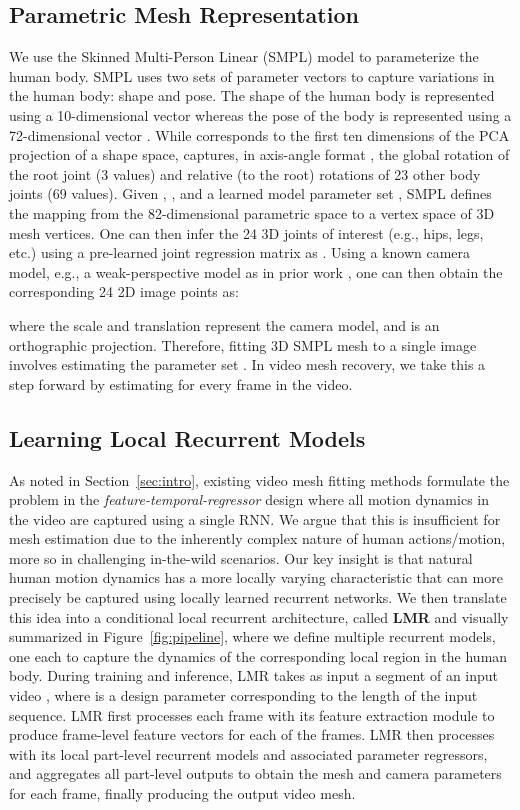 \documentclass[10pt,twocolumn,letterpaper]{article}
\begin{document}
\subsection{Parametric Mesh Representation}
\label{sec:smpl}
We use the Skinned Multi-Person Linear (SMPL) model \cite{loper2015smpl} to parameterize the human body. SMPL uses two sets of parameter vectors to capture variations in the human body: shape and pose. The shape of the human body is represented using a 10-dimensional vector  whereas the pose of the body is represented using a 72-dimensional vector . While  corresponds to the first ten dimensions of the PCA projection of a shape space,  captures, in axis-angle format \cite{caccavale1999six}, the global rotation of the root joint (3 values) and relative (to the root) rotations of 23 other body joints (69 values). Given , , and a learned model parameter set , SMPL defines the mapping  from the 82-dimensional parametric space to a vertex space of  3D mesh vertices. One can then infer the 24 3D joints of interest (e.g., hips, legs, etc.)  using a pre-learned joint regression matrix  as . Using a known camera model, e.g., a weak-perspective model as in prior work \cite{hmrKanazawa17}, one can then obtain the corresponding 24 2D image points  as:

where the scale  and translation  represent the camera model, and  is an orthographic projection. Therefore, fitting 3D SMPL mesh to a single image involves estimating the parameter set . In video mesh recovery, we take this a step forward by estimating  for every frame in the video. 

\subsection{Learning Local Recurrent Models}

As noted in Section~\ref{sec:intro}, existing video mesh fitting methods formulate the problem in the \textsl{feature-temporal-regressor} design where all motion dynamics in the video are captured using a single RNN. We argue that this is insufficient for mesh estimation due to the inherently complex nature of human actions/motion, more so in challenging in-the-wild scenarios. Our key insight is that natural human motion dynamics has a more locally varying characteristic that can more precisely be captured using locally learned recurrent networks. We then translate this idea into a conditional local recurrent architecture, called \textbf{LMR} and visually summarized in Figure~\ref{fig:pipeline}, where we define multiple recurrent models, one each to capture the dynamics of the corresponding local region in the human body. During training and inference, LMR takes as input a segment of an input video , where  is a design parameter corresponding to the length of the input sequence. LMR first processes each frame with its feature extraction module to produce frame-level feature vectors  for each of the  frames. LMR then processes  with its local part-level recurrent models and associated parameter regressors, and aggregates all part-level outputs to obtain the mesh and camera parameters  for each frame, finally producing the output video mesh.
\end{document}
